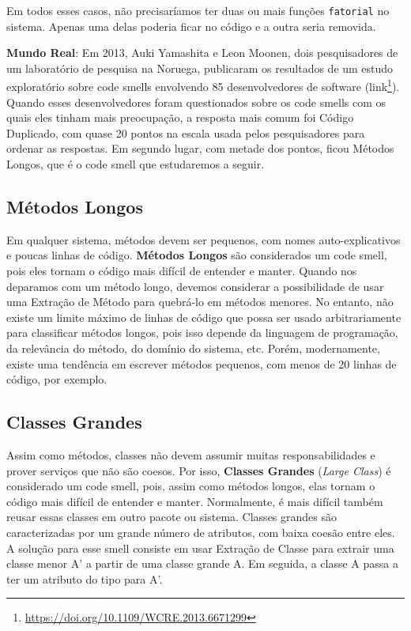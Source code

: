 \documentclass[
  11pt,
  twoside]{book}
\newcommand{\passthrough}[1]{#1}
\DeclareRobustCommand{\href}[2]{#2\footnote{\url{#1}}}
\newenvironment{esmbox}{\centering \vspace{1.5ex} \begin{tcolorbox}[breakable, colback=backcolor, width=4.9in]}{\end{tcolorbox} \vspace{1.5ex}}
\begin{document}
Em todos esses casos, não precisaríamos ter duas ou mais funções
\passthrough{\lstinline!fatorial!} no sistema. Apenas uma delas poderia
ficar no código e a outra seria removida.

\begin{esmbox}

\textbf{Mundo Real}: Em 2013, Auki Yamashita e Leon Moonen, dois
pesquisadores de um laboratório de pesquisa na Noruega, publicaram os
resultados de um estudo exploratório sobre code smells envolvendo 85
desenvolvedores de software
(\href{https://doi.org/10.1109/WCRE.2013.6671299}{link}). Quando esses
desenvolvedores foram questionados sobre os code smells com os quais
eles tinham mais preocupação, a resposta mais comum foi Código
Duplicado, com quase 20 pontos na escala usada pelos pesquisadores para
ordenar as respostas. Em segundo lugar, com metade dos pontos, ficou
Métodos Longos, que é o code smell que estudaremos a seguir.

\end{esmbox}

\hypertarget{muxe9todos-longos}{%
\subsection{Métodos Longos}\label{muxe9todos-longos}}


Em qualquer sistema, métodos devem ser pequenos, com nomes
auto-explicativos e poucas linhas de código. \textbf{Métodos Longos} são
considerados um code smell, pois eles tornam o código mais difícil de
entender e manter. Quando nos deparamos com um método longo, devemos
considerar a possibilidade de usar uma Extração de Método para quebrá-lo
em métodos menores. No entanto, não existe um limite máximo de linhas de
código que possa ser usado arbitrariamente para classificar métodos
longos, pois isso depende da linguagem de programação, da relevância do
método, do domínio do sistema, etc. Porém, modernamente, existe uma
tendência em escrever métodos pequenos, com menos de 20 linhas de
código, por exemplo.

\hypertarget{classes-grandes}{%
\subsection{Classes Grandes}\label{classes-grandes}}


Assim como métodos, classes não devem assumir muitas responsabilidades e
prover serviços que não são coesos. Por isso, \textbf{Classes Grandes}
(\emph{Large Class}) é considerado um code smell, pois, assim como
métodos longos, elas tornam o código mais difícil de entender e manter.
Normalmente, é mais difícil também reusar essas classes em outro pacote
ou sistema. Classes grandes são caracterizadas por um grande número de
atributos, com baixa coesão entre eles. A solução para esse smell
consiste em usar Extração de Classe para extrair uma classe menor A' a
partir de uma classe grande A. Em seguida, a classe A passa a ter um
atributo do tipo para A'.
\end{document}
